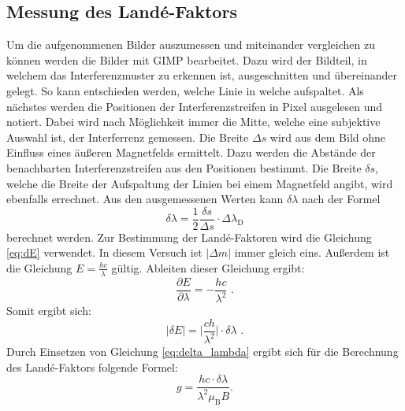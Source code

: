 \subsection{Messung des Landé-Faktors}
\label{sec:Lande}
Um die aufgenommenen Bilder auszumessen und miteinander vergleichen zu können
werden die Bilder mit GIMP \cite{gimp} bearbeitet. Dazu wird der Bildteil, in welchem
das Interferenzmuster zu erkennen ist, ausgeschnitten und übereinander gelegt.
So kann entschieden werden, welche Linie in welche aufspaltet.
Als nächstes
werden die Positionen der Interferenzstreifen in Pixel ausgelesen und notiert.
Dabei wird nach Möglichkeit immer die Mitte, welche eine subjektive Auswahl ist,
der Interferrenz gemessen. Die Breite $\Delta s$ wird aus dem Bild ohne Einfluss
eines äußeren Magnetfelds ermittelt. Dazu werden die Abstände der benachbarten
Interferenzstreifen aus den Positionen bestimmt. Die Breite $\delta s$, welche
die Breite der Aufspaltung der Linien bei einem Magnetfeld angibt, wird ebenfalls
errechnet.
Aus den ausgemessenen Werten kann $\delta \lambda$ nach der Formel
\begin{equation}
  \label{eq:delta_lambda}
  \delta \lambda = \frac{1}{2} \frac{\delta s}{\Delta s}\cdot \Delta \lambda_\text{D}
\end{equation}
berechnet werden.
Zur Bestimmung der Landé-Faktoren wird die Gleichung \ref{eq:dE}
verwendet. In diesem Versuch ist $|\Delta m|$ immer gleich eins. %
Außerdem ist die Gleichung $E=\frac{hc}{\lambda}$ gültig. Ableiten
dieser Gleichung ergibt:
\begin{equation}
 \frac{\partial E}{\partial \lambda} = -\frac{hc}{\lambda^2}\,\, .
\end{equation}
Somit ergibt sich:
\begin{equation}
 | \delta E | = \bigl| \frac{ch}{\lambda^2} \bigr| \cdot \delta \lambda \,\, .
\end{equation}
Durch Einsetzen von Gleichung \ref{eq:delta_lambda}
ergibt sich für die Berechnung des Landé-Faktors folgende Formel:
\begin{equation}
  \label{eq:Lande_berechnen}
 g = \frac{hc\cdot\delta\lambda}{\lambda^2\mu_\text{B}B}.
\end{equation}

